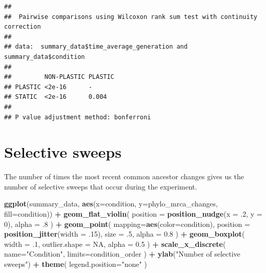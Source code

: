 \documentclass[]{book}
\newenvironment{Shaded}{\begin{snugshade}}{\end{snugshade}}
\newcommand{\DataTypeTok}[1]{\textcolor[rgb]{0.13,0.29,0.53}{#1}}
\newcommand{\DecValTok}[1]{\textcolor[rgb]{0.00,0.00,0.81}{#1}}
\newcommand{\FloatTok}[1]{\textcolor[rgb]{0.00,0.00,0.81}{#1}}
\newcommand{\KeywordTok}[1]{\textcolor[rgb]{0.13,0.29,0.53}{\textbf{#1}}}
\newcommand{\NormalTok}[1]{#1}
\newcommand{\OperatorTok}[1]{\textcolor[rgb]{0.81,0.36,0.00}{\textbf{#1}}}
\newcommand{\OtherTok}[1]{\textcolor[rgb]{0.56,0.35,0.01}{#1}}
\newcommand{\StringTok}[1]{\textcolor[rgb]{0.31,0.60,0.02}{#1}}
\begin{document}
\begin{verbatim}
## 
##  Pairwise comparisons using Wilcoxon rank sum test with continuity correction 
## 
## data:  summary_data$time_average_generation and summary_data$condition 
## 
##         NON-PLASTIC PLASTIC
## PLASTIC <2e-16      -      
## STATIC  <2e-16      0.004  
## 
## P value adjustment method: bonferroni
\end{verbatim}

\hypertarget{selective-sweeps}{%
\section{Selective sweeps}\label{selective-sweeps}}

The number of times the most recent common ancestor changes gives us the number of selective sweeps that occur during the experiment.

\begin{Shaded}
\begin{Highlighting}[]
\KeywordTok{ggplot}\NormalTok{(summary_data, }\KeywordTok{aes}\NormalTok{(}\DataTypeTok{x=}\NormalTok{condition, }\DataTypeTok{y=}\NormalTok{phylo_mrca_changes, }\DataTypeTok{fill=}\NormalTok{condition)) }\OperatorTok{+}
\StringTok{  }\KeywordTok{geom_flat_violin}\NormalTok{(}
    \DataTypeTok{position =} \KeywordTok{position_nudge}\NormalTok{(}\DataTypeTok{x =} \FloatTok{.2}\NormalTok{, }\DataTypeTok{y =} \DecValTok{0}\NormalTok{),}
    \DataTypeTok{alpha =} \FloatTok{.8}
\NormalTok{  ) }\OperatorTok{+}
\StringTok{  }\KeywordTok{geom_point}\NormalTok{(}
    \DataTypeTok{mapping=}\KeywordTok{aes}\NormalTok{(}\DataTypeTok{color=}\NormalTok{condition),}
    \DataTypeTok{position =} \KeywordTok{position_jitter}\NormalTok{(}\DataTypeTok{width =} \FloatTok{.15}\NormalTok{),}
    \DataTypeTok{size =} \FloatTok{.5}\NormalTok{,}
    \DataTypeTok{alpha =} \FloatTok{0.8}
\NormalTok{  ) }\OperatorTok{+}
\StringTok{  }\KeywordTok{geom_boxplot}\NormalTok{(}
    \DataTypeTok{width =} \FloatTok{.1}\NormalTok{,}
    \DataTypeTok{outlier.shape =} \OtherTok{NA}\NormalTok{,}
    \DataTypeTok{alpha =} \FloatTok{0.5}
\NormalTok{  ) }\OperatorTok{+}
\StringTok{  }\KeywordTok{scale_x_discrete}\NormalTok{(}
    \DataTypeTok{name=}\StringTok{"Condition"}\NormalTok{,}
    \DataTypeTok{limits=}\NormalTok{condition_order}
\NormalTok{  ) }\OperatorTok{+}
\StringTok{  }\KeywordTok{ylab}\NormalTok{(}\StringTok{"Number of selective sweeps"}\NormalTok{) }\OperatorTok{+}
\StringTok{  }\KeywordTok{theme}\NormalTok{(}
    \DataTypeTok{legend.position=}\StringTok{"none"}
\NormalTok{  )}
\end{Highlighting}
\end{Shaded}
\end{document}
